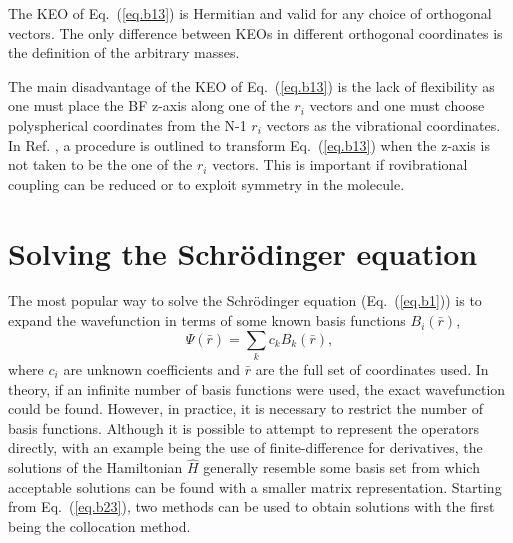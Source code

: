 The KEO of Eq.~(\ref{eq.b13}) is Hermitian and valid for any choice of orthogonal vectors.  The only difference between KEOs in different orthogonal coordinates is the definition of the arbitrary masses.

The main disadvantage of the KEO of Eq.~(\ref{eq.b13}) is the lack of flexibility as one must place the BF z-axis along one of the $r_i$ vectors and one must choose polyspherical coordinates from the N-1 $r_i$ vectors as the vibrational coordinates.  In Ref. , a procedure is outlined to transform Eq.~(\ref{eq.b13}) when the z-axis is not taken to be the one of the $r_i$ vectors.  This is important if rovibrational coupling can be reduced or to exploit symmetry in the molecule.

\section{Solving the Schr\"{o}dinger equation}

The most popular way to solve the Schr\"{o}dinger equation (Eq.~(\ref{eq.b1})) is to expand the wavefunction in terms of some known basis functions $B_i\left(\bar{r}\right)$,
\begin{equation}\label{eq.b23}
\Psi\left(\bar{r}\right)=\sum_{k}c_k B_k\left(\bar{r}\right),
\end{equation}
where $c_i$ are unknown coefficients and $\bar{r}$ are the full set of coordinates used.  In theory, if an infinite number of basis functions were used, the exact wavefunction could be found.  However, in practice, it is necessary to restrict the number of basis functions.  Although it is possible to attempt to represent the operators directly, with an example being the use of finite-difference for derivatives, the solutions of the Hamiltonian $\hat{H}$ generally resemble some basis set from which acceptable solutions can be found with a smaller matrix representation.   Starting from Eq.~(\ref{eq.b23}), two methods can be used to obtain solutions with the first being the collocation method.

